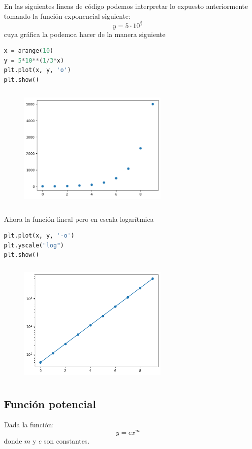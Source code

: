 En las siguientes lineas de c\'odigo podemos interpretar lo expuesto anteriormente tomando la funci\'on exponencial siguiente:
$$
y = 5\cdot 10^{\frac{x}{3}}
$$
cuya gr\'afica la podemoa hacer de la manera siguiente
\begin{lstlisting}[language=Python] 
x = arange(10)
y = 5*10**(1/3*x)
plt.plot(x, y, 'o')
plt.show()
\end{lstlisting}
\begin{figure}[h]
\begin{center}
\includegraphics[height=2.4in,width=2.9in]{figuras/fig14}  
\label{figexp1}
\end{center}
\end{figure}

Ahora la funci\'on lineal pero en escala logar\'itmica
\begin{lstlisting}[language=Python] 
plt.plot(x, y, '-o')
plt.yscale("log")
plt.show()
\end{lstlisting}
\begin{figure}[h]
\begin{center}
\includegraphics[height=2.4in,width=2.9in]{figuras/fig15}  
\label{figexp1lin}
\end{center}
\end{figure}

\newpage
\subsection{Funci\'on potencial}
Dada la funci\'on:
\begin{equation}
y= c x^m
\label{funpot}
\end{equation}
donde $m$ y $c$ son constantes. 


